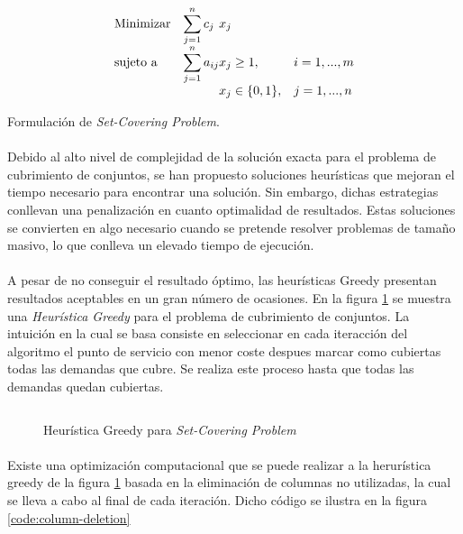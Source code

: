\documentclass[spanish]{article}
\begin{document}
		\begin{eqfloat}
			\begin{equation}
				\begin{array}{ll@{}ll}
					\text{Minimizar}	& \displaystyle\sum\limits_{j=1}^{n} c_{j}	&	x_{j} &\\
					\text{sujeto a}		& \displaystyle\sum\limits_{j = 1}^n a_{ij}	&	x_{j} \geq 1,  &i=1 ,..., m\\
														&                                           &	x_{j} \in \{0,1\}, &j=1 ,..., n
				\end{array}
			\end{equation}
			\caption{Formulación de \emph{Set-Covering Problem}.}
			\label{eq:set_covering}
		\end{eqfloat}

		\paragraph{}
		Debido al alto nivel de complejidad de la solución exacta para el problema de cubrimiento de conjuntos, se han propuesto soluciones heurísticas que mejoran el tiempo necesario para encontrar una solución. Sin embargo, dichas estrategias conllevan una penalización en cuanto optimalidad de resultados. Estas soluciones se convierten en algo necesario cuando se pretende resolver problemas de tamaño masivo, lo que conlleva un elevado tiempo de ejecución.

		\paragraph{}
		A pesar de no conseguir el resultado óptimo, las heurísticas Greedy presentan resultados aceptables en un gran número de ocasiones. En la figura \ref{code:greedy-set-covering} se muestra una \emph{Heurística Greedy} para el problema de cubrimiento de conjuntos. La intuición en la cual se basa consiste en seleccionar en cada iteracción del algoritmo el punto de servicio con menor coste despues marcar como cubiertas todas las demandas que cubre. Se realiza este proceso hasta que todas las demandas quedan cubiertas.

		\begin{figure}[h]
			\centering
			\inputminted{basic}{./code/set-covering-greedy.mos}
			\caption{Heurística Greedy para \emph{Set-Covering Problem}}
			\label{code:greedy-set-covering}
		\end{figure}

		\paragraph{}
		Existe una optimización computacional que se puede realizar a la herurística greedy de la figura \ref{code:greedy-set-covering} basada en la eliminación de columnas no utilizadas, la cual se lleva a cabo al final de cada iteración. Dicho código se ilustra en la figura \ref{code:column-deletion}
\end{document}
